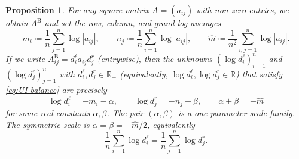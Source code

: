 \documentclass[10pt,a4paper]{amsart}
\newtheorem{proposition}{Proposition}
\begin{document}
\begin{proposition}\label{prop:gauge-fully}
For any square matrix $A = (a_{ij})$ with non-zero entries, we obtain $A^\mathrm{B}$ and set the row, column, and grand log-averages \begin{equation}\label{eq:row-col-gra-mean-rep}
m_i\coloneq \frac1n\sum_{j=1}^n\log|a_{ij}|,
\qquad
n_j\coloneq \frac1n\sum_{i=1}^n\log|a_{ij}|,
\qquad
\hat{m}\coloneq \frac1{n^2}\sum_{i,j=1}^n\log|a_{ij}|.
\end{equation}
If we write $A^\mathrm{B}_{ij}=d^\ell_i a_{ij} {d^r_j}$ (entrywise), then the unknowns $(\log d^\ell_i)_{i=1}^n$ and $(\log {d^r_j})_{j=1}^n$ with $d^\ell_i,{d^r_j}\in\mathbb R_{+}$ (equivalently, $\log d^\ell_i,\log {d^r_j}\in\mathbb R$) that satisfy \cref{eq:UI-balance} are precisely
\begin{equation}
\log d^\ell_i=-m_i-\alpha,\qquad \log {d^r_j}=-n_j-\beta,\qquad \alpha+\beta=-\hat{m} 
\end{equation}
for some real constants $\alpha,\beta$. The pair $(\alpha,\beta)$ is a one-parameter \emph{scale family}. The \emph{symmetric scale} is $\alpha=\beta=-\hat{m}/2$, equivalently
\begin{equation}
\frac1n\sum_{i=1}^n \log d^\ell_i=\frac1n\sum_{j=1}^n \log {d^r_j}.
\end{equation}
\end{proposition}
\end{document}
